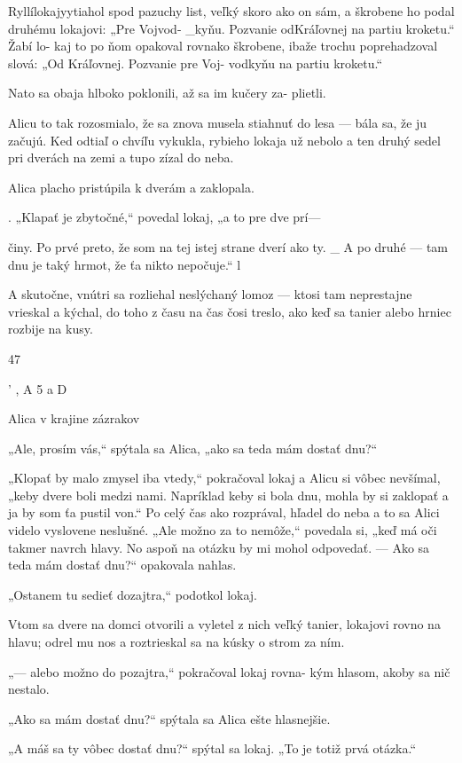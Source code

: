 \documentclass[12pt]{article}
\begin{document}
\begin{Parallel}[p]{}{}
{{Ryllílokajyytiahol spod pazuchy list, veľký skoro ako on
sám, a škrobene ho podal druhému lokajovi: „Pre Vojvod-
_kyňu. Pozvanie odKráľovnej na partiu kroketu.“ Žabí lo-
kaj to po ňom opakoval rovnako škrobene, ibaže trochu
poprehadzoval slová: „Od Kráľovnej. Pozvanie pre Voj-
vodkyňu na partiu kroketu.“

Nato sa obaja hlboko poklonili, až sa im kučery za-
plietli.

Alicu to tak rozosmialo, že sa znova musela stiahnuť do
lesa — bála sa, že ju začujú. Ked odtiaľ o chvíľu vykukla,
rybieho lokaja už nebolo a ten druhý sedel pri dverách na
zemi a tupo zízal do neba.

Alica placho pristúpila k dverám a zaklopala.

. „Klapať je zbytočné,“ povedal lokaj, „a to pre dve prí—

činy. Po prvé preto, že som na tej istej strane dverí ako ty. _
A po druhé — tam dnu je taký hrmot, že ťa nikto nepočuje.“ l

A skutočne, vnútri sa rozliehal neslýchaný lomoz — ktosi
tam neprestajne vrieskal a kýchal, do toho z času na čas čosi
treslo, ako keď sa tanier alebo hrniec rozbije na kusy.

47

  

 

' , A
5 a
D

Alica v krajine zázrakov

„Ale, prosím vás,“ spýtala sa Alica, „ako sa teda mám
dostať dnu?“

„Klopať by malo zmysel iba vtedy,“ pokračoval lokaj
a Alicu si vôbec nevšímal, „keby dvere boli medzi nami.
Napríklad keby si bola dnu, mohla by si zaklopať a ja by
som ťa pustil von.“ Po celý čas ako rozprával, hľadel do neba
a to sa Alici videlo vyslovene neslušné. „Ale možno za to
nemôže,“ povedala si, „keď má oči takmer navrch hlavy. No
aspoň na otázku by mi mohol odpovedať. — Ako sa teda
mám dostať dnu?“ opakovala nahlas.

„Ostanem tu sedieť dozajtra,“ podotkol lokaj.

Vtom sa dvere na domci otvorili a vyletel z nich veľký
tanier, lokajovi rovno na hlavu; odrel mu nos a roztrieskal
sa na kúsky o strom za ním.

„— alebo možno do pozajtra,“ pokračoval lokaj rovna-
kým hlasom, akoby sa nič nestalo.

„Ako sa mám dostať dnu?“ spýtala sa Alica ešte
hlasnejšie.

„A máš sa ty vôbec dostať dnu?“ spýtal sa lokaj. „To je
totiž prvá otázka.“

}}
\end{Parallel}
\end{document}
